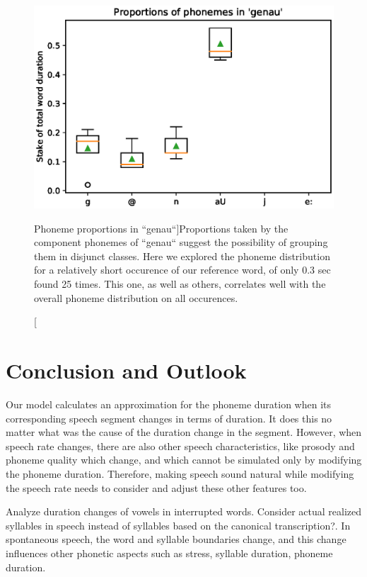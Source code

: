 \documentclass[a4paper]{scrreprt}
\begin{document}
\begin{figure}[htbp]
	\includegraphics[width=.55\linewidth]{../Graphen/Sound_boxplot_genau.eps}
	\centering
	\caption[Phoneme proportions in ``genau``]{Proportions taken by the component phonemes of ``genau`` suggest the possibility of grouping them in disjunct classes. Here we explored the phoneme distribution for a relatively short occurence of our reference word, of only 0.3 sec found 25 times. This one, as well as others, correlates well with the overall phoneme distribution on all occurences.}
	\label{fig:boxplot_genau}
\end{figure}

\chapter{Conclusion and Outlook}
Our model calculates an approximation for the phoneme duration when its corresponding speech segment changes in terms of duration. It does this no matter what was the cause of the duration change in the segment. However, when speech rate changes, there are also other speech characteristics, like prosody and phoneme quality which change, and which cannot be simulated only by modifying the phoneme duration. Therefore, making speech sound natural while modifying the speech rate needs to consider and adjust these other features too.

Analyze duration changes of vowels in interrupted words.
Consider actual realized syllables in speech instead of syllables based on the canonical transcription?. In spontaneous speech, the word and syllable boundaries change, and this change influences other phonetic aspects such as stress, syllable duration, phoneme duration.

\printbibliography
\end{document}
